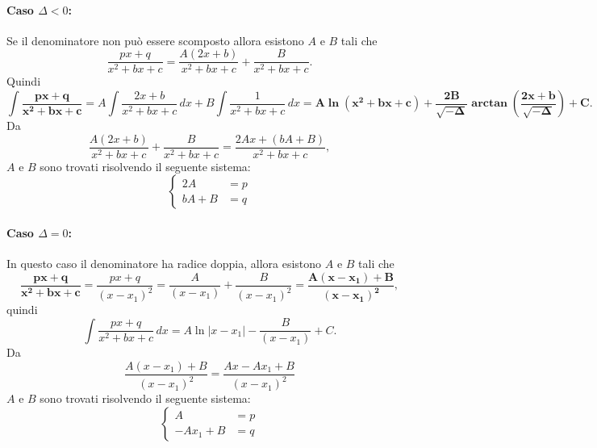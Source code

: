 \paragraph{Caso $\Delta<0$:} Se il denominatore non può essere scomposto allora esistono $A$ e $B$ tali che
\begin{equation*}
    \frac{px+q}{x^2+bx+c}= \frac{A(2x+b)}{x^2+bx+c} + \frac{B}{x^2+bx+c}.
\end{equation*}
Quindi
\begin{equation*}
    \boldsymbol{\int\frac{px+q}{x^2+bx+c}=}A\int\frac{2x+b}{x^2+bx+c}\,dx + B\int\frac{1}{x^2+bx+c}\, dx = \boldsymbol{A\ln(x^2+bx+c)+\frac{2B}{\sqrt{-\Delta}}\arctan\left(\frac{2x+b}{\sqrt{-\Delta}}\right)+C.}
\end{equation*}
Da
\begin{equation*}
    \frac{A(2x+b)}{x^2+bx+c} + \frac{B}{x^2+bx+c} = \frac{2Ax +(bA+B)}{x^2+bx+c},
\end{equation*}
$A$ e $B$ sono trovati risolvendo il seguente sistema:
\begin{equation*}
    \begin{cases}
        2A &= p\\
        bA + B &= q
    \end{cases}
\end{equation*}

\paragraph{Caso $\Delta=0$:} In questo caso il denominatore ha radice doppia, allora esistono $A$ e $B$ tali che
\begin{equation*}
    \boldsymbol{\frac{px+q}{x^2+bx+c}} = \frac{px+q}{(x-x_1)^2} = \frac{A}{(x-x_1)} + \frac{B}{(x-x_1)^2} = \boldsymbol{\frac{A(x-x_1)+B}{(x-x_1)^2}},
\end{equation*}
quindi
\begin{equation*}
    \int\frac{px+q}{x^2+bx+c}\,dx = A\ln|x-x_1| - \frac{B}{(x-x_1)}+C.
\end{equation*}
Da
\begin{equation*}
    \frac{A(x-x_1)+B}{(x-x_1)^2} = \frac{Ax -Ax_1 + B}{(x-x_1)^2}
\end{equation*}
$A$ e $B$ sono trovati risolvendo il seguente sistema:
\begin{equation*}
    \begin{cases}
        A &= p\\
        -Ax_1 + B &=q
    \end{cases}
\end{equation*}

